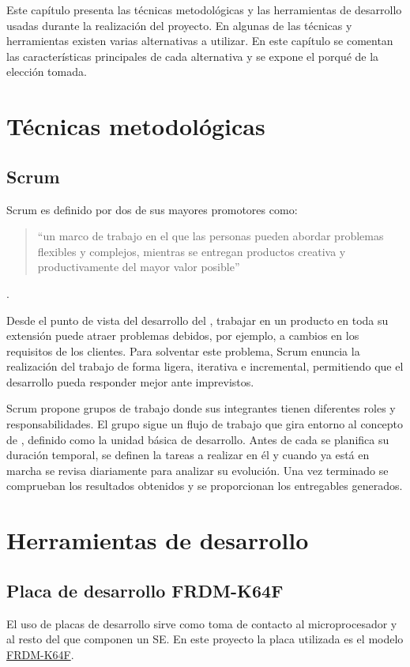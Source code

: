 Este capítulo presenta las técnicas metodológicas y las herramientas de
desarrollo usadas durante la realización del proyecto. En algunas de las
técnicas y herramientas existen varias alternativas a utilizar. En este capítulo
se comentan las características principales de cada alternativa y se expone el
porqué de la elección tomada.

\section{Técnicas metodológicas}{\label{sec:tecnicas}}

\subsection{Scrum}{\label{sec:scrum}}
Scrum es definido por dos de sus mayores promotores \textcite{schwaber2017}
como:
\begin{quotation}``un marco de trabajo en el que las personas pueden
  abordar problemas flexibles y complejos, mientras se entregan productos creativa y
  productivamente del mayor valor posible''
\end{quotation}.

Desde el punto de vista del desarrollo del , trabajar en
un producto en toda su extensión puede atraer problemas debidos, por ejemplo, a
cambios en los requisitos de los clientes. Para solventar este problema, Scrum
enuncia la realización del trabajo de forma ligera, iterativa e incremental,
permitiendo que el desarrollo pueda responder mejor ante imprevistos.

Scrum propone grupos de trabajo donde sus integrantes tienen diferentes roles y
responsabilidades. El grupo sigue un flujo de trabajo que gira entorno al
concepto de , definido como la unidad básica de
desarrollo. Antes de cada  se planifica su duración
temporal, se definen la tareas a realizar en él y cuando ya está en marcha se
revisa diariamente para analizar su evolución. Una vez terminado se comprueban
los resultados obtenidos y se proporcionan los entregables generados.

\section{Herramientas  de desarrollo}
  {\label{sec:herramientas}}

\subsection{Placa de desarrollo FRDM-K64F}{\label{sec:k64f}}
El uso de placas de desarrollo sirve como toma de contacto al microprocesador y
al resto del  que componen un SE. En este proyecto la
placa utilizada es el modelo
\href{https://www.nxp.com/support/developer-resources/evaluation-and-development-boards/freedom-development-boards/mcu-boards/freedom-development-platform-for-kinetis-k64-k63-and-k24-mcus:FRDM-K64F}
{FRDM-K64F}.

